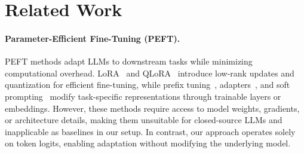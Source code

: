 \section{Related Work}
\label{sec:relatedwork}
\paragraph{Parameter-Efficient Fine-Tuning (PEFT).}  
PEFT methods adapt LLMs to downstream tasks while minimizing computational overhead. LoRA~\citep{hu2021lora} and QLoRA~\citep{dettmers2024qlora} introduce low-rank updates and quantization for efficient fine-tuning, while prefix tuning~\citep{li-liang-2021-prefix}, adapters~\citep{hu2023llm}, and soft prompting~\citep{lester2021power} modify task-specific representations through trainable layers or embeddings. However, these methods require access to model weights, gradients, or architecture details, making them unsuitable for closed-source LLMs and inapplicable as baselines in our setup. In contrast, our approach operates solely on token logits, enabling adaptation without modifying the underlying model.

 



